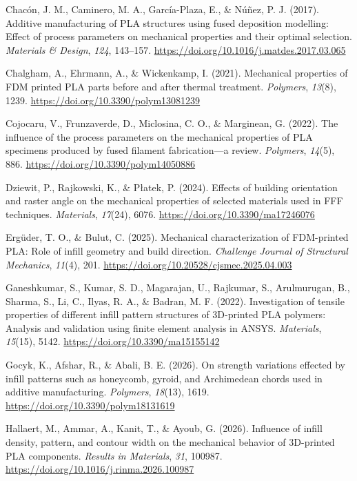 Chacón, J. M., Caminero, M. A., García-Plaza, E., \& Núñez, P. J. (2017). Additive manufacturing of PLA structures using fused deposition modelling: Effect of process parameters on mechanical properties and their optimal selection. \textit{Materials \& Design}, \textit{124}, 143–157. \url{https://doi.org/10.1016/j.matdes.2017.03.065}\par
Chalgham, A., Ehrmann, A., \& Wickenkamp, I. (2021). Mechanical properties of FDM printed PLA parts before and after thermal treatment. \textit{Polymers}, \textit{13}(8), 1239. \url{https://doi.org/10.3390/polym13081239}\par
Cojocaru, V., Frunzaverde, D., Miclosina, C. O., \& Marginean, G. (2022). The influence of the process parameters on the mechanical properties of PLA specimens produced by fused filament fabrication—a review. \textit{Polymers}, \textit{14}(5), 886. \url{https://doi.org/10.3390/polym14050886}\par
Dziewit, P., Rajkowski, K., \& Płatek, P. (2024). Effects of building orientation and raster angle on the mechanical properties of selected materials used in FFF techniques. \textit{Materials}, \textit{17}(24), 6076. \url{https://doi.org/10.3390/ma17246076}\par
Ergüder, T. O., \& Bulut, C. (2025). Mechanical characterization of FDM-printed PLA: Role of infill geometry and build direction. \textit{Challenge Journal of Structural Mechanics}, \textit{11}(4), 201. \url{https://doi.org/10.20528/cjsmec.2025.04.003}\par
Ganeshkumar, S., Kumar, S. D., Magarajan, U., Rajkumar, S., Arulmurugan, B., Sharma, S., Li, C., Ilyas, R. A., \& Badran, M. F. (2022). Investigation of tensile properties of different infill pattern structures of 3D-printed PLA polymers: Analysis and validation using finite element analysis in ANSYS. \textit{Materials}, \textit{15}(15), 5142. \url{https://doi.org/10.3390/ma15155142}\par
Gocyk, K., Afshar, R., \& Abali, B. E. (2026). On strength variations effected by infill patterns such as honeycomb, gyroid, and Archimedean chords used in additive manufacturing. \textit{Polymers}, \textit{18}(13), 1619. \url{https://doi.org/10.3390/polym18131619}\par
Hallaert, M., Ammar, A., Kanit, T., \& Ayoub, G. (2026). Influence of infill density, pattern, and contour width on the mechanical behavior of 3D-printed PLA components. \textit{Results in Materials}, \textit{31}, 100987. \url{https://doi.org/10.1016/j.rinma.2026.100987}\par
